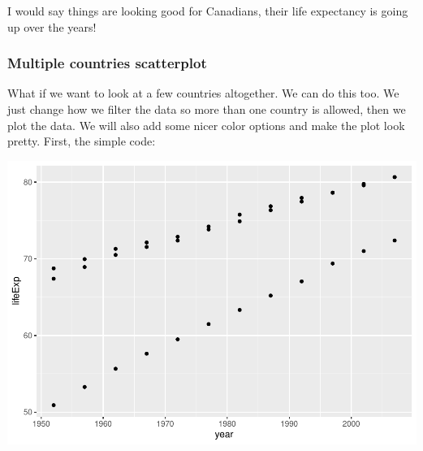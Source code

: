 \documentclass[]{book}
\newenvironment{Shaded}{\begin{snugshade}}{\end{snugshade}}
\newcommand{\KeywordTok}[1]{\textcolor[rgb]{0.13,0.29,0.53}{\textbf{#1}}}
\newcommand{\DataTypeTok}[1]{\textcolor[rgb]{0.13,0.29,0.53}{#1}}
\newcommand{\StringTok}[1]{\textcolor[rgb]{0.31,0.60,0.02}{#1}}
\newcommand{\CommentTok}[1]{\textcolor[rgb]{0.56,0.35,0.01}{\textit{#1}}}
\newcommand{\OtherTok}[1]{\textcolor[rgb]{0.56,0.35,0.01}{#1}}
\newcommand{\OperatorTok}[1]{\textcolor[rgb]{0.81,0.36,0.00}{\textbf{#1}}}
\newcommand{\NormalTok}[1]{#1}
\begin{document}
I would say things are looking good for Canadians, their life expectancy
is going up over the years!

\subsubsection{Multiple countries
scatterplot}\label{multiple-countries-scatterplot}

What if we want to look at a few countries altogether. We can do this
too. We just change how we filter the data so more than one country is
allowed, then we plot the data. We will also add some nicer color
options and make the plot look pretty. First, the simple code:

\begin{Shaded}
\end{Shaded}

\includegraphics{Statistics_Lab_files/figure-latex/1scatterC-1.pdf}
\end{document}
